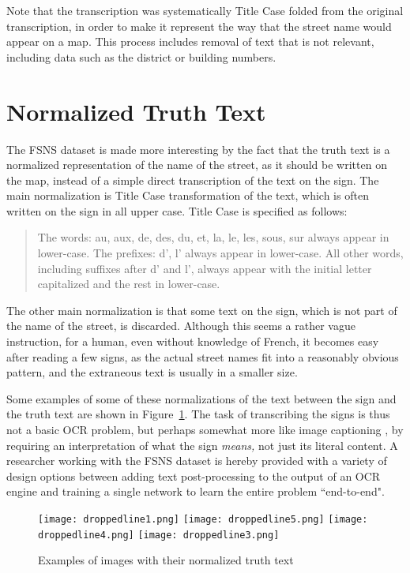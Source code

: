 \documentclass[runningheads]{llncs}
\begin{document}
Note that the transcription was systematically Title Case folded from the original transcription, in order
 to make it represent the way that the street name would appear on a map. This process includes removal of
 text that is not relevant, including data such as the district or building numbers.

\section{Normalized Truth Text} \label{normalizedtruth}
The FSNS dataset is made more interesting by the fact that the truth text is a normalized representation
 of the name of the street, as it should be written on the map, instead of a simple direct transcription
 of the text on the sign. The main normalization is Title Case transformation of the text, which is often
 written on the sign in all upper case. Title Case is specified as follows:
\begin{quote}
The words: au, aux, de, des, du, et, la, le, les, sous, sur  always appear in lower-case.
The prefixes: d', l' always appear in lower-case.
All other words, including suffixes after d' and l', always appear with the initial letter capitalized and the rest in lower-case.
\end{quote}
The other main normalization is that some text on the sign, which is not part of the name of the street, is discarded. Although this seems a rather vague instruction, for a human, even without knowledge of French, it becomes easy after reading a few signs, as the actual street names fit into a reasonably obvious pattern, and the extraneous text is usually in a smaller size.

Some examples of some of these normalizations of the text between the sign and the truth text are shown in
 Figure~\ref{fig:normalized}.
 The task of transcribing the signs is thus not a basic OCR problem, but perhaps somewhat more like image
 captioning \cite{vinyals2015show}, by requiring an interpretation of what the sign {\it means,} not just its
 literal content. A researcher working with the FSNS dataset is hereby provided with a variety of design
 options between adding text post-processing to the output of an OCR engine and training a single
 network to learn the entire problem ``end-to-end".

\begin{figure}
\centering
\texttt{[image: droppedline1.png]}
\texttt{[image: droppedline5.png]}
\texttt{[image: droppedline4.png]}
\texttt{[image: droppedline3.png]}
\caption{Examples of images with their normalized truth text}
\label{fig:normalized}
\end{figure}
\end{document}
